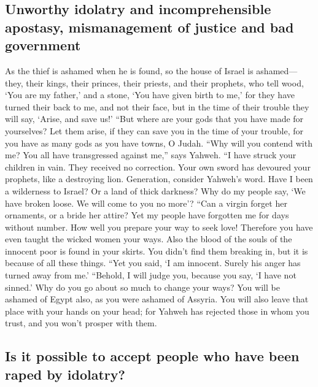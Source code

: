 \hypertarget{unworthy-idolatry-and-incomprehensible-apostasy-mismanagement-of-justice-and-bad-government}{%
\subsection{Unworthy idolatry and incomprehensible apostasy,
mismanagement of justice and bad
government}\label{unworthy-idolatry-and-incomprehensible-apostasy-mismanagement-of-justice-and-bad-government}}

 As the thief is ashamed when he is found, so the house
of Israel is ashamed--- they, their kings, their princes, their priests,
and their prophets,  who tell wood, `You are my father,'
and a stone, `You have given birth to me,' for they have turned their
back to me, and not their face, but in the time of their trouble they
will say, `Arise, and save us!'  ``But where are your
gods that you have made for yourselves? Let them arise, if they can save
you in the time of your trouble, for you have as many gods as you have
towns, O Judah.  ``Why will you contend with me? You all
have transgressed against me,'' says Yahweh.  ``I have
struck your children in vain. They received no correction. Your own
sword has devoured your prophets, like a destroying lion.
 Generation, consider Yahweh's word. Have I been a
wilderness to Israel? Or a land of thick darkness? Why do my people say,
`We have broken loose. We will come to you no more'? 
``Can a virgin forget her ornaments, or a bride her attire? Yet my
people have forgotten me for days without number.  How
well you prepare your way to seek love! Therefore you have even taught
the wicked women your ways.  Also the blood of the souls
of the innocent poor is found in your skirts. You didn't find them
breaking in, but it is because of all these things. 
``Yet you said, `I am innocent. Surely his anger has turned away from
me.' ``Behold, I will judge you, because you say, `I have not sinned.'
 Why do you go about so much to change your ways? You
will be ashamed of Egypt also, as you were ashamed of Assyria.
 You will also leave that place with your hands on your
head; for Yahweh has rejected those in whom you trust, and you won't
prosper with them.

\hypertarget{is-it-possible-to-accept-people-who-have-been-raped-by-idolatry}{%
\subsection{Is it possible to accept people who have been raped by
idolatry?}\label{is-it-possible-to-accept-people-who-have-been-raped-by-idolatry}}

